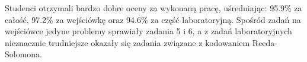 Studenci otrzymali bardzo dobre oceny za wykonaną pracę, uśredniając: 95.9\% za całość, 97.2\% za wejściówkę oraz 94.6\% za część laboratoryjną. Spośród zadań na wejściówce jedyne problemy sprawiały zadania 5 i 6, a z zadań laboratoryjnych nieznacznie trudniejsze okazały się zadania związane z kodowaniem Reeda-Solomona.
